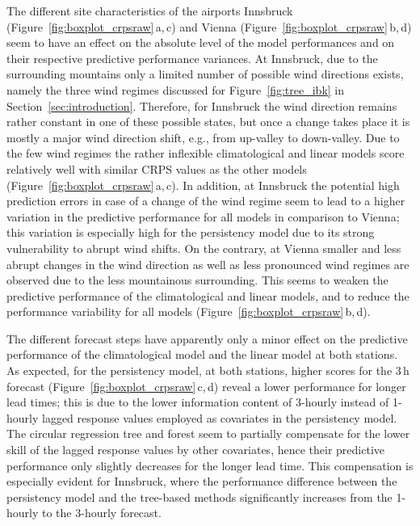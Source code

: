\documentclass[nojss,shortnames]{jss}
\numberwithin{equation}{section}
\begin{document}
The different site characteristics of the airports Innsbruck
(Figure~\ref{fig:boxplot_crpsraw}\,a,\,c) and Vienna
(Figure~\ref{fig:boxplot_crpsraw}\,b,\,d) seem to have an effect on the
absolute level of the model performances and on their respective predictive
performance variances. At Innsbruck, due to the surrounding mountains only a
limited number of possible wind directions exists, namely the three wind
regimes discussed for Figure~\ref{fig:tree_ibk} in
Section~\ref{sec:introduction}. Therefore, for Innsbruck the wind direction
remains rather constant in one of these possible states, but once a change
takes place it is mostly a major wind direction shift, e.g., from up-valley to
down-valley. Due to the few wind regimes the rather inflexible climatological
and linear models score relatively well with similar CRPS values as the other
models (Figure~\ref{fig:boxplot_crpsraw}\,a,\,c). In addition, at Innsbruck the
potential high prediction errors in case of a change of the wind regime seem to
lead to a higher variation in the predictive performance for all models in
comparison to Vienna; this variation is especially high for the persistency
model due to its strong vulnerability to abrupt wind shifts. On the contrary,
at Vienna smaller and less abrupt changes in the wind direction as well as less
pronounced wind regimes are observed due to the less mountainous surrounding.
This seems to weaken the predictive performance of the climatological and
linear models, and to reduce the performance variability for all models
(Figure~\ref{fig:boxplot_crpsraw}\,b,\,d).

The different forecast steps have apparently only a minor effect on the
predictive performance of the climatological model and the linear model at both
stations. As expected, for the persistency model, at both stations, higher
scores for the $3$\,h forecast (Figure~\ref{fig:boxplot_crpsraw}\,c,\,d) reveal
a lower performance for longer lead times; this is due to the lower information
content of 3-hourly instead of 1-hourly lagged response values employed as
covariates in the persistency model. The circular regression tree and forest
seem to partially compensate for the lower skill of the lagged response values
by other covariates, hence their predictive performance only slightly decreases
for the longer lead time. This compensation is especially evident for
Innsbruck, where the performance difference between the persistency model and
the tree-based methods significantly increases from the 1-hourly to the
3-hourly forecast.
\end{document}
